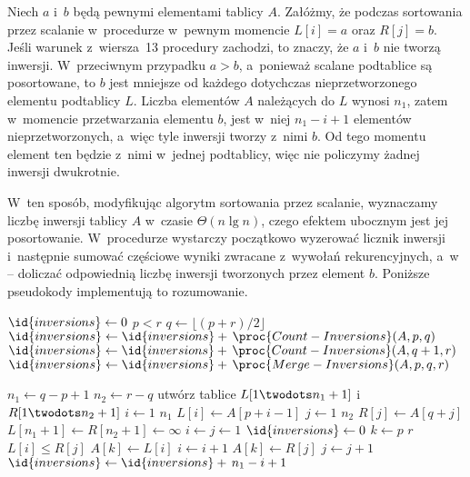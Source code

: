 \subproblem %
Niech $a$ i~$b$ będą pewnymi elementami tablicy $A$. Załóżmy, że podczas sortowania przez scalanie w~procedurze  w~pewnym momencie $L[i]=a$ oraz $R[j]=b$. Jeśli warunek z~wiersza~13 procedury  zachodzi, to znaczy, że $a$ i~$b$ nie tworzą inwersji. W~przeciwnym przypadku $a>b$, a~ponieważ scalane podtablice są posortowane, to $b$ jest mniejsze od każdego dotychczas nieprzetworzonego elementu podtablicy $L$. Liczba elementów $A$ należących do $L$ wynosi $n_1$, zatem w~momencie przetwarzania elementu $b$, jest w~niej $n_1-i+1$ elementów nieprzetworzonych, a~więc tyle inwersji tworzy z~nimi $b$. Od tego momentu element ten będzie z~nimi w~jednej podtablicy, więc nie policzymy żadnej inwersji dwukrotnie.

W~ten sposób, modyfikując algorytm sortowania przez scalanie, wyznaczamy liczbę inwersji  tablicy $A$ w~czasie $\Theta(n\lg n)$, czego efektem ubocznym jest jej posortowanie. W~procedurze  wystarczy początkowo wyzerować licznik inwersji i~następnie sumować częściowe wyniki zwracane z~wywołań rekurencyjnych, a~w~ -- doliczać odpowiednią liczbę inwersji tworzonych przez element $b$. Poniższe pseudokody implementują to rozumowanie.

\begin{codebox}
\li	$\id{inversions}\gets0$
\li	\If $p<r$
\li		\Then
			$q\gets\lfloor(p+r)/2\rfloor$
\li			$\id{inversions}\gets\id{inversions}+\,\proc{Count-Inversions}(A,p,q)$
\li			$\id{inversions}\gets\id{inversions}+\,\proc{Count-Inversions}(A,q+1,r)$
\li			$\id{inversions}\gets\id{inversions}+\,\proc{Merge-Inversions}(A,p,q,r)$
		\End
\li	\Return {}
\end{codebox}

\begin{codebox}
\li	$n_1\gets q-p+1$
\li	$n_2\gets r-q$
\li	utwórz tablice $L[1\twodots n_1+1]$ i~$R[1\twodots n_2+1]$
\li	\For $i\gets1$ \To $n_1$
\li		\Do $L[i]\gets A[p+i-1]$
		\End
\li	\For $j\gets1$ \To $n_2$
\li		\Do $R[j]\gets A[q+j]$
		\End
\li	$L[n_1+1]\gets R[n_2+1]\gets\infty$
\li	$i\gets j\gets1$
\li	$\id{inversions}\gets0$
\li	\For $k\gets p$ \To $r$
\li		\Do
			\If $L[i]\le R[j]$
\li				\Then
					$A[k]\gets L[i]$
\li					$i\gets i+1$
\li				\Else
					$A[k]\gets R[j]$
\li					$j\gets j+1$
\li					$\id{inversions}\gets\id{inversions}+\,n_1-i+1$
				\End
		\End
\li	\Return {}
\end{codebox}

\endinput
